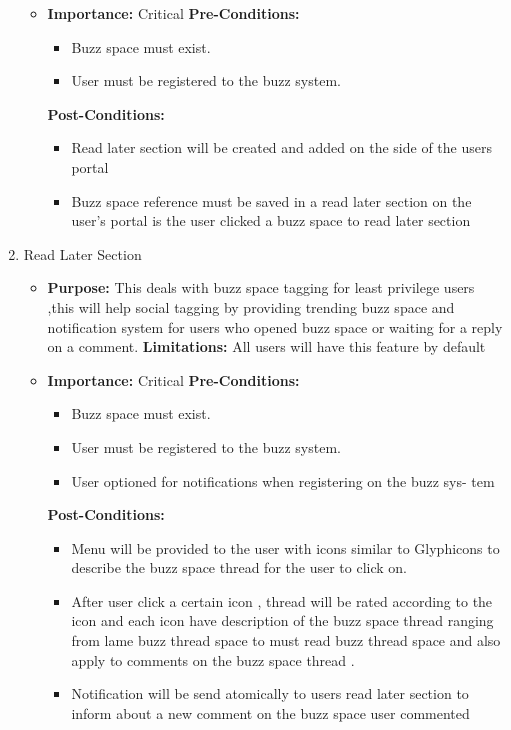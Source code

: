\documentclass[11pt]{article}
\begin{document}
\begin{enumerate}
\begin{itemize}
\item \textbf{Importance:} Critical\newline
\textbf{Pre-Conditions: }
	\begin{itemize}
	\item Buzz space must exist.
	\item User must be registered to the buzz system.

	\end{itemize}

\textbf{Post-Conditions: }
	\begin{itemize}
	\item Read later section will be created and added on the side of the
users portal
	\item Buzz space reference must be saved in a read later section on the
user’s portal is the user clicked a buzz space to read later section
	
	\end{itemize}
\end{itemize}

\item Read Later Section
\begin{itemize}
\item \textbf{Purpose:}
This deals with buzz space tagging for least privilege users
,this will help social tagging by providing trending buzz space and
notification system for users who opened buzz space or waiting for a
reply on a comment.
\newline
\textbf{Limitations:} 
All users will have this feature by default

\item \textbf{Importance:} Critical\newline
\textbf{Pre-Conditions: }
	\begin{itemize}
	\item Buzz space must exist.
	\item User must be registered to the buzz system.
	\item User optioned for notifications when registering on the buzz sys-
tem

	\end{itemize}

\textbf{Post-Conditions: }
	\begin{itemize}
	\item Menu will be provided to the user with icons similar to Glyphicons
to describe the buzz space thread for the user to click on.
	\item After user click a certain icon , thread will be rated according to
the icon and each icon have description of the buzz space thread
ranging from lame buzz thread space to must read buzz thread
space and also apply to comments on the buzz space thread .
\item Notification will be send atomically to users read later section to
inform about a new comment on the buzz space user commented
	
	\end{itemize}
\end{itemize}


\end{enumerate}
\end{document}
